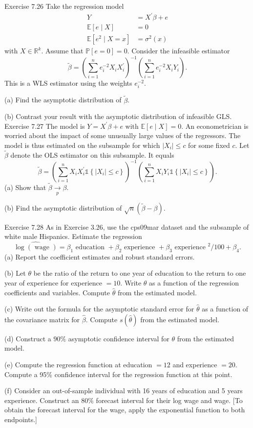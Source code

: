 \documentclass[10pt]{article}
\begin{document}
Exercise 7.26 Take the regression model
$$
\begin{aligned}
Y &=X^{\prime} \beta+e \\
\mathbb{E}[e \mid X] &=0 \\
\mathbb{E}\left[e^{2} \mid X=x\right] &=\sigma^{2}(x)
\end{aligned}
$$
with $X \in \mathbb{R}^{k}$. Assume that $\mathbb{P}[e=0]=0$. Consider the infeasible estimator
$$
\widetilde{\beta}=\left(\sum_{i=1}^{n} e_{i}^{-2} X_{i} X_{i}^{\prime}\right)^{-1}\left(\sum_{i=1}^{n} e_{i}^{-2} X_{i} Y_{i}\right) .
$$
This is a WLS estimator using the weights $e_{i}^{-2}$.

(a) Find the asymptotic distribution of $\widetilde{\beta}$.

(b) Contrast your result with the asymptotic distribution of infeasible GLS. Exercise 7.27 The model is $Y=X^{\prime} \beta+e$ with $\mathbb{E}[e \mid X]=0$. An econometrician is worried about the impact of some unusually large values of the regressors. The model is thus estimated on the subsample for which $\left|X_{i}\right| \leq c$ for some fixed $c$. Let $\widetilde{\beta}$ denote the OLS estimator on this subsample. It equals
$$
\widetilde{\beta}=\left(\sum_{i=1}^{n} X_{i} X_{i}^{\prime} \mathbb{1}\left\{\left|X_{i}\right| \leq c\right\}\right)^{-1}\left(\sum_{i=1}^{n} X_{i} Y_{i} \mathbb{1}\left\{\left|X_{i}\right| \leq c\right\}\right) .
$$
(a) Show that $\widetilde{\beta} \underset{p}{\longrightarrow} \beta$.

(b) Find the asymptotic distribution of $\sqrt{n}(\widetilde{\beta}-\beta)$.

Exercise 7.28 As in Exercise 3.26, use the cps09mar dataset and the subsample of white male Hispanics. Estimate the regression
$$
\widehat{\log (\text { wage })}=\beta_{1} \text { education }+\beta_{2} \text { experience }+\beta_{3} \text { experience }^{2} / 100+\beta_{4} .
$$
(a) Report the coefficient estimates and robust standard errors.

(b) Let $\theta$ be the ratio of the return to one year of education to the return to one year of experience for experience $=10$. Write $\theta$ as a function of the regression coefficients and variables. Compute $\widehat{\theta}$ from the estimated model.

(c) Write out the formula for the asymptotic standard error for $\hat{\theta}$ as a function of the covariance matrix for $\widehat{\beta}$. Compute $s(\widehat{\theta})$ from the estimated model.

(d) Construct a $90 \%$ asymptotic confidence interval for $\theta$ from the estimated model.

(e) Compute the regression function at education $=12$ and experience $=20$. Compute a 95\% confidence interval for the regression function at this point.

(f) Consider an out-of-sample individual with 16 years of education and 5 years experience. Construct an $80 \%$ forecast interval for their log wage and wage. [To obtain the forecast interval for the wage, apply the exponential function to both endpoints.]
\end{document}
